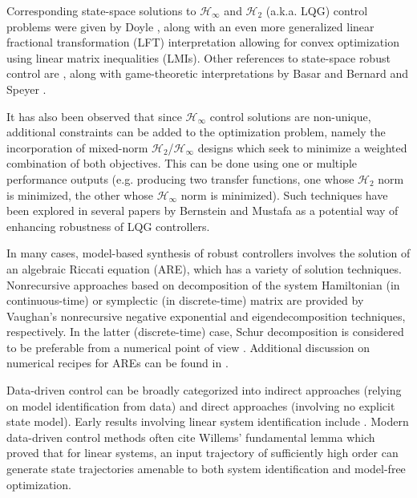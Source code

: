 Corresponding state-space solutions to $\mathcal{H}_{\infty}$ and $\mathcal{H}_{2}$ (a.k.a. LQG) control problems were given by Doyle \cite{doyle1988state}, along with an even more generalized linear fractional transformation (LFT) interpretation \cite{doyle1991review} allowing for convex optimization using linear matrix inequalities (LMIs).  Other references to state-space robust control are \cite{limebeer1989discrete, iglesias1991state, toivonen1995lecture, deodhare1998modern}, along with game-theoretic interpretations by Basar and Bernard \cite{basar1989dynamic, bacsar2008h, bernhard1991lecture} and Speyer \cite{rhee1991game}.

It has also been observed that since $\mathcal{H}_{\infty}$ control solutions are non-unique, additional constraints can be added to the optimization problem, namely the incorporation of mixed-norm $\mathcal{H}_{2}$/$\mathcal{H}_{\infty}$ designs which seek to minimize a weighted combination of both objectives.  This can be done using one or multiple performance outputs (e.g. producing two transfer functions, one whose $\mathcal{H}_{2}$ norm is minimized, the other whose $\mathcal{H}_{\infty}$ norm is minimized).  Such techniques have been explored in several papers by Bernstein and Mustafa \cite{haddad1990generalized, haddad1991mixed, mustafa1991lqg} as a potential way of enhancing robustness of LQG controllers.
%
%
%
%
%

In many cases, model-based synthesis of robust controllers involves the solution of an algebraic Riccati equation (ARE), which has a variety of solution techniques.  Nonrecursive approaches based on decomposition of the system Hamiltonian (in continuous-time) or symplectic (in discrete-time) matrix are provided by Vaughan's nonrecursive negative exponential \cite{vaughan1969negative} and eigendecomposition \cite{vaughan1970nonrecursive} techniques, respectively.  In the latter (discrete-time) case, Schur decomposition is considered to be preferable from a numerical point of view \cite{laub1979schur}.  Additional discussion on numerical recipes for AREs can be found in \cite{pappas1980numerical, gardiner1986generalization, gudmundsson1992scaling, chen1994non, takaba1996discrete, feng2009solving, rojas2011discrete, aliev1992discrete}.

Data-driven control can be broadly categorized into indirect approaches (relying on model identification from data) and direct approaches (involving no explicit state model).  Early results involving linear system identification include \cite{ho1966effective, juang1985eigensystem, ljung1987theory, smith1989model, bayard1992criterion, schrama1992accurate, makila1995worst, mckelvey1996subspace, de1997suboptimal, ljung1998system}.  Modern data-driven control methods often cite Willems' fundamental lemma \cite{willems2005note} which proved that for linear systems, an input trajectory of sufficiently high order can generate state trajectories amenable to both system identification and model-free optimization.

